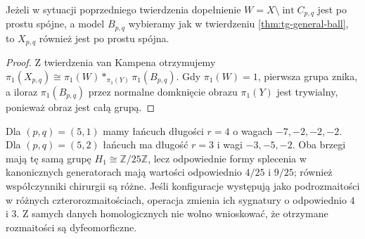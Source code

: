 \begin{wniosek}
Jeżeli w sytuacji poprzedniego twierdzenia dopełnienie
$W=X\setminus\operatorname{int}C_{p,q}$ jest po prostu spójne,
a model $B_{p,q}$ wybieramy jak w twierdzeniu
\ref{thm:tg-general-ball}, to $X_{p,q}$ również jest po prostu
spójna.
\end{wniosek}

\begin{proof}
Z twierdzenia van Kampena otrzymujemy
$\pi_1(X_{p,q})\cong\pi_1(W)*_{\pi_1(Y)}\pi_1(B_{p,q})$.
Gdy $\pi_1(W)=1$, pierwsza grupa znika, a iloraz
$\pi_1(B_{p,q})$ przez normalne domknięcie obrazu
$\pi_1(Y)$ jest trywialny, ponieważ obraz jest całą grupą.
\end{proof}

\begin{przyklad}
Dla $(p,q)=(5,1)$ mamy łańcuch długości $r=4$ o wagach
$-7,-2,-2,-2$. Dla $(p,q)=(5,2)$ łańcuch ma długość
$r=3$ i wagi $-3,-5,-2$. Oba brzegi mają tę samą grupę
$H_1\cong\mathbb Z/25\mathbb Z$, lecz odpowiednie formy
splecenia w kanonicznych generatorach mają wartości
odpowiednio $4/25$ i $9/25$; również współczynniki chirurgii
są różne. Jeśli konfiguracje występują jako podrozmaitości
w różnych czterorozmaitościach, operacja zmienia ich sygnatury
o odpowiednio $4$ i $3$. Z samych danych homologicznych
nie wolno wnioskować, że otrzymane rozmaitości są dyfeomorficzne.
\end{przyklad}

\begin{center}
\end{center}

